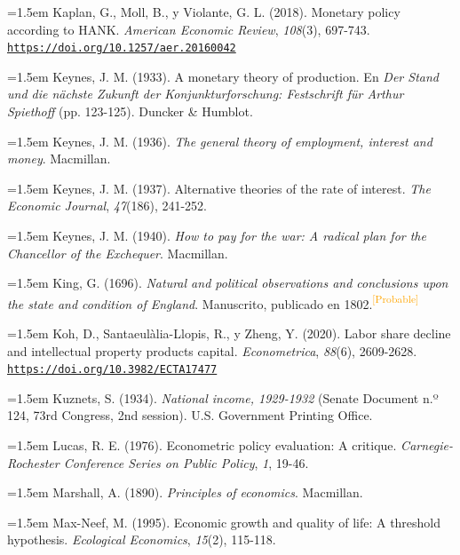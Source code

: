 \documentclass[10pt,a4paper]{article}
\begin{document}
\noindent\hangindent=1.5em Kaplan, G., Moll, B., y Violante, G. L. (2018). Monetary policy according to HANK. \textit{American Economic Review}, \textit{108}(3), 697-743. \href{https://doi.org/10.1257/aer.20160042}{\nolinkurl{https://doi.org/10.1257/aer.20160042}}

\noindent\hangindent=1.5em Keynes, J. M. (1933). A monetary theory of production. En \textit{Der Stand und die nächste Zukunft der Konjunkturforschung: Festschrift für Arthur Spiethoff} (pp. 123-125). Duncker \& Humblot.

\noindent\hangindent=1.5em Keynes, J. M. (1936). \textit{The general theory of employment, interest and money}. Macmillan.

\noindent\hangindent=1.5em Keynes, J. M. (1937). Alternative theories of the rate of interest. \textit{The Economic Journal}, \textit{47}(186), 241-252.

\noindent\hangindent=1.5em Keynes, J. M. (1940). \textit{How to pay for the war: A radical plan for the Chancellor of the Exchequer}. Macmillan.

\noindent\hangindent=1.5em King, G. (1696). \textit{Natural and political observations and conclusions upon the state and condition of England}. Manuscrito, publicado en 1802.\textcolor{orange}{\textsuperscript{[Probable]}}

\noindent\hangindent=1.5em Koh, D., Santaeulàlia-Llopis, R., y Zheng, Y. (2020). Labor share decline and intellectual property products capital. \textit{Econometrica}, \textit{88}(6), 2609-2628. \href{https://doi.org/10.3982/ECTA17477}{\nolinkurl{https://doi.org/10.3982/ECTA17477}}

\noindent\hangindent=1.5em Kuznets, S. (1934). \textit{National income, 1929-1932} (Senate Document n.º 124, 73rd Congress, 2nd session). U.S. Government Printing Office.

\noindent\hangindent=1.5em Lucas, R. E. (1976). Econometric policy evaluation: A critique. \textit{Carnegie-Rochester Conference Series on Public Policy}, \textit{1}, 19-46.

\noindent\hangindent=1.5em Marshall, A. (1890). \textit{Principles of economics}. Macmillan.

\noindent\hangindent=1.5em Max-Neef, M. (1995). Economic growth and quality of life: A threshold hypothesis. \textit{Ecological Economics}, \textit{15}(2), 115-118.
\end{document}
